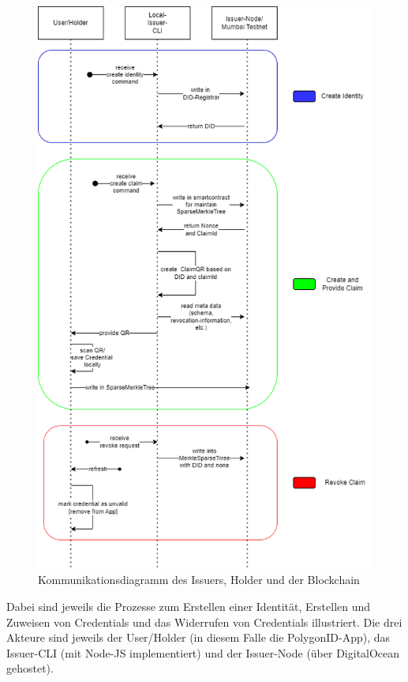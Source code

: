 \begin{figure}[H]
	\centering	
	\includegraphics[scale=0.5]{media/ablaufdiagram.drawio}
	\caption{Kommunikationsdiagramm des Issuers, Holder und der Blockchain}
	\label{fig:komm}
\end{figure}
Dabei sind jeweils die Prozesse zum Erstellen einer Identität, Erstellen und Zuweisen von Credentials und das Widerrufen von Credentials illustriert. Die drei Akteure sind jeweils der User/Holder (in diesem Falle die PolygonID-App), das Issuer-CLI (mit Node-JS implementiert) und der Issuer-Node (über DigitalOcean gehostet).
